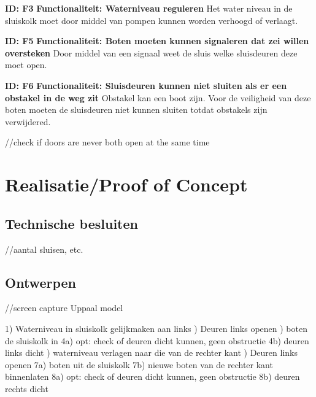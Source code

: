 \documentclass{article}
\begin{document}
\textbf{ID: F3} \newline
\textbf{Functionaliteit: Waterniveau reguleren} \newline
Het water niveau in de sluiskolk moet door middel van pompen kunnen worden verhoogd of verlaagt. \newline

\textbf{ID: F5} \newline
\textbf{Functionaliteit: Boten moeten kunnen signaleren dat zei willen oversteken} \newline
Door middel van een signaal weet de sluis welke sluisdeuren deze moet open. \newline

\textbf{ID: F6} \newline
\textbf{Functionaliteit: Sluisdeuren kunnen niet sluiten als er een obstakel in de weg zit} \newline
Obstakel kan een boot zijn. Voor de veiligheid van deze boten moeten de sluisdeuren niet kunnen sluiten totdat obstakels zijn verwijdered.  \newline

//check if doors are never both open at the same time

\section{Realisatie/Proof of Concept}

\subsection{Technische besluiten}
//aantal sluisen, etc.
\subsection{Ontwerpen}
//screen capture Uppaal model \newline

1) Waterniveau in sluiskolk gelijkmaken aan links ) Deuren links openen ) boten de sluiskolk in \newline
4a) opt: check of deuren dicht kunnen, geen obstructie \newline
4b) deuren links dicht ) waterniveau verlagen naar die van de rechter kant ) Deuren links openen \newline
7a) boten uit de sluiskolk \newline
7b) nieuwe boten van de rechter kant binnenlaten \newline
8a) opt: check of deuren dicht kunnen, geen obstructie \newline
8b) deuren rechts dicht \newline
\end{document}
